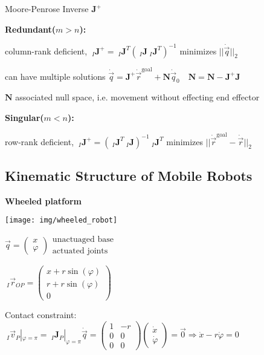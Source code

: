 \documentclass[fontsize=6pt]{scrartcl}
\newcommand{\mat}[1]{\mathbf{#1}}
\begin{document}
\begin{multicols*}{4}
Moore-Penrose Inverse $ \mat J^+$

\textbf{Redundant($m>n$):}

column-rank deficient, $~_I\mat J^+ = ~_I\mat J^T(~_I\mat J ~_I\mat J^T)^{-1}$ minimizes $||\dot{\vec{q}}||_2$

can have multiple solutions $\dot{\vec q} = \mat J^+ \dot{\vec r}^\text{goal} + \mat N \dot{\vec{q}}_0 \quad \mat N = \mat N - \mat J^+\mat J$

$\mat N$ associated null space, i.e. movement without effecting end effector

\textbf{Singular($m<n$):}

row-rank deficient, $~_I\mat J^+ = (~_I\mat J^T ~_I\mat J)^{-1}~_I\mat J^T$ minimizes $||\dot{\vec{r}}^\text{goal} - \dot{\vec{r}}||_2$

\subsection*{Kinematic Structure of Mobile Robots}


\begin{minipage}{0.35\linewidth}
\textbf{Wheeled platform}

\texttt{[image: img/wheeled\_robot]}

\end{minipage}
\begin{minipage}{0.65\linewidth}
$\vec{q} = \begin{pmatrix}
x\\
\varphi
\end{pmatrix}
\begin{matrix}
\text{unactuaged base}\\
\text{actuated joints}
\end{matrix}
$

$ ~_I\vec{r}_{OP}=
\begin{pmatrix}
x + r \sin(\varphi)\\
r + r \sin(\varphi)\\
0
\end{pmatrix}
$

Contact constraint:
$ ~_I\vec{v}_P|_{\varphi = \pi} = ~_I \mat J_P |_{\varphi = \pi} \dot{\vec q} = \begin{pmatrix}
1 & -r\\
0 & 0\\
0 & 0
\end{pmatrix}
\begin{pmatrix}
\dot x\\
\dot \varphi
\end{pmatrix}
= \vec{0}
\Rightarrow \dot{x} - r \dot \varphi = 0
$


\end{minipage}
\end{multicols*}
\end{document}
